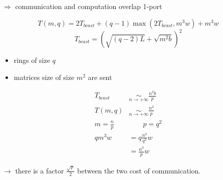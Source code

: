 $\Rightarrow$ communication and computation overlap 1-port

\[T(m,q)=2T_{bcast}+(q-1)\max (2T_{bcast},m^3w)+m^3w\]
\[T_{bcast}=(\sqrt{(q-2)L}+\sqrt{m^2b})^2\]
\begin{itemize}
\item rings of size $q$
\item matrices size of size $m^2$ are sent
\end{itemize}

\begin{align*}
T_{bcast} &\underset{n\to +\infty}{\sim}\frac{n^2b}{p}\\
T(m,q) &\underset{n\to +\infty}{\sim} \frac{n^3}{p}\\
m=\frac{n}{p} &\qquad p=q^2\\
qm^3w &= q \frac{n^3}{q^3}w\\
& = \frac{n^3}{p}w
\end{align*}

$\to$ there is a factor $\frac{\sqrt{p}}{2}$ between the two cost of communication.